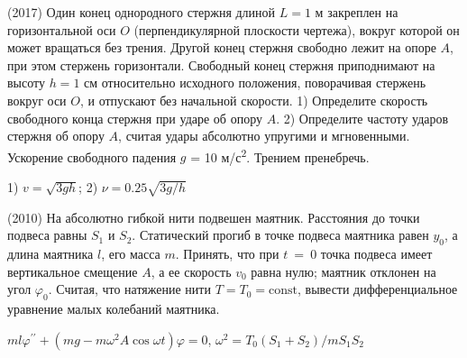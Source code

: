 \begin{ex}
(2017) Один конец однородного стержня длиной $L=1$ м закреплен на горизонтальной оси $O$ (перпендикулярной плоскости чертежа), вокруг которой он может вращаться без трения. Другой конец стержня свободно лежит на опоре $A$, при этом стержень горизонтали. Свободный конец стержня приподнимают на высоту $h = 1$ см относительно исходного положения, поворачивая стержень
вокруг оси $O$, и отпускают без начальной скорости. 1) Определите скорость
свободного конца стержня при ударе об опору $A$. 2) Определите частоту ударов
стержня об опору $A$, считая удары абсолютно упругими и мгновенными.
Ускорение свободного падения $g$ = 10 м/с\textsuperscript{2}. Трением пренебречь.
\begin{center}

\end{center}
\begin{ans}
1) $v=\sqrt{3gh}$; 2) $\nu = 0.25\sqrt{3g/h }$
\end{ans}
\end{ex}

\begin{ex}
(2010) На абсолютно гибкой нити подвешен маятник. Расстояния до точки подвеса равны $S_1$ и $S_2$. 
Статический прогиб в точке подвеса маятника равен $y_0$, а длина маятника $l$, его масса $m$. 
Принять, что при $t$~=~0 точка подвеса имеет вертикальное смещение $A$, а ее скорость $v_0$ равна нулю; маятник отклонен на угол $\varphi_0$. 
Считая, что натяжение нити $T = T_0 = \text{const}$, вывести дифференциальное уравнение малых колебаний маятника.
\begin{center}

\end{center}
\begin{ans}
$ml \varphi^{\prime \prime} + (mg-m \omega^2 A \cos \omega t) \varphi = 0$, $\omega^2 = T_0(S_1+S_2)/m S_1 S_2$
\end{ans}
\end{ex}

